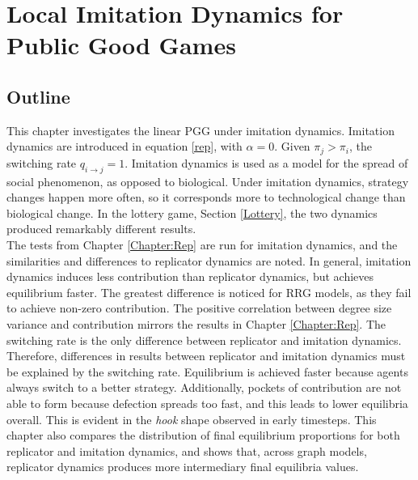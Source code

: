 \section{Local Imitation Dynamics for Public Good Games}
\subsection{Outline}
This chapter investigates the linear PGG under imitation dynamics. Imitation dynamics are introduced in equation \eqref{rep}, with $\alpha = 0$. Given $\pi_j>\pi_i$, the switching rate $q_{i\to j} = 1$. Imitation dynamics is used as a model for the spread of social phenomenon, as opposed to biological. Under imitation dynamics, strategy changes happen more often, so it corresponds more to technological change than biological change. In the lottery game, Section \ref{Lottery}, the two dynamics produced remarkably different results. \\

The tests from Chapter \ref{Chapter:Rep} are run for imitation dynamics, and the similarities and differences to replicator dynamics are noted. In general, imitation dynamics induces less contribution than replicator dynamics, but achieves equilibrium faster. The greatest difference is noticed for RRG models, as they fail to achieve non-zero contribution. The positive correlation between degree size variance and contribution mirrors the results in Chapter \ref{Chapter:Rep}. The switching rate is the only difference between replicator and imitation dynamics. Therefore, differences in results between replicator and imitation dynamics must be explained by the switching rate. Equilibrium is achieved faster because agents always switch to a better strategy. Additionally, pockets of contribution are not able to form because defection spreads too fast, and this leads to lower equilibria overall. This is evident in the \emph{hook} shape observed in early timesteps. This chapter also compares the distribution of final equilibrium proportions for both replicator and imitation dynamics, and shows that, across graph models, replicator dynamics produces more intermediary final equilibria values. 
\newpage

